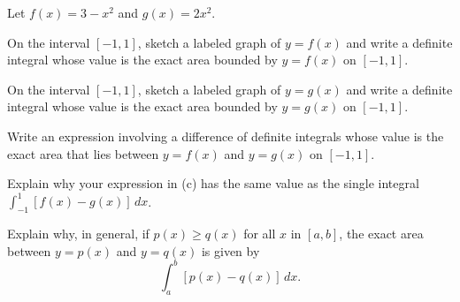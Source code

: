 \begin{exercises}
    \item Let $f(x) = 3 - x^2$ and $g(x) = 2x^2$.
    \ba
    	\item On the interval $[-1,1]$, sketch a labeled graph of $y = f(x)$ and write a definite integral whose value is the exact area bounded by $y = f(x)$ on $[-1,1]$.
	\item On the interval $[-1,1]$, sketch a labeled graph of $y = g(x)$ and write a definite integral whose value is the exact area bounded by $y = g(x)$ on $[-1,1]$.
	\item Write an expression involving a difference of definite integrals whose value is the exact area that lies between $y = f(x)$ and $y = g(x)$ on $[-1,1]$.
	\item Explain why your expression in (c) has the same value as the single integral \\ $\int_{-1}^1 [f(x) - g(x)] \, dx$.
	\item Explain why, in general, if $p(x) \ge q(x)$ for all $x$ in $[a,b]$, the exact area between $y = p(x)$ and $y = q(x)$ is given by
	$$\int_a^b [p(x) - q(x)] \, dx.$$
    \ea
    

\end{exercises}
\afterexercises
